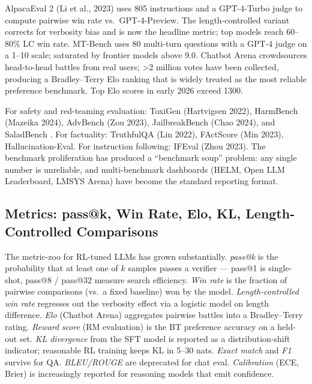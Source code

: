 \documentclass{article}
\begin{document}
AlpacaEval 2 (Li et al., 2023) uses 805 instructions and a GPT-4-Turbo judge to compute pairwise win rate vs.~GPT-4-Preview. The length-controlled variant \citep{park2024disentanglinglengt} corrects for verbosity bias and is now the headline metric; top models reach 60--80\% LC win rate. MT-Bench \citep{zheng20232023} uses 80 multi-turn questions with a GPT-4 judge on a 1--10 scale; saturated by frontier models above 9.0. Chatbot Arena \citep{chiang20242024} crowdsources head-to-head battles from real users; \textgreater2 million votes have been collected, producing a Bradley--Terry Elo ranking that is widely treated as the most reliable preference benchmark. Top Elo scores in early 2026 exceed 1300.

For safety and red-teaming evaluation: ToxiGen (Hartvigsen 2022), HarmBench (Mazeika 2024), AdvBench (Zou 2023), JailbreakBench (Chao 2024), and SaladBench \citep{li20252025}. For factuality: TruthfulQA (Lin 2022), FActScore (Min 2023), Hallucination-Eval. For instruction following: IFEval (Zhou 2023). The benchmark proliferation has produced a ``benchmark soup'' problem: any single number is unreliable, and multi-benchmark dashboards (HELM, Open LLM Leaderboard, LMSYS Arena) have become the standard reporting format.

\subsection{Metrics: pass@k, Win Rate, Elo, KL, Length-Controlled Comparisons}\label{metrics-passk-win-rate-elo-kl-length-controlled-comparisons}

The metric-zoo for RL-tuned LLMs has grown substantially. \emph{pass@k} \citep{chen20212021} is the probability that at least one of \(k\) samples passes a verifier --- pass@1 is single-shot, pass@8 / pass@32 measure search efficiency. \emph{Win rate} is the fraction of pairwise comparisons (vs.~a fixed baseline) won by the model. \emph{Length-controlled win rate} \citep{park2024disentanglinglengt} regresses out the verbosity effect via a logistic model on length difference. \emph{Elo} (Chatbot Arena) aggregates pairwise battles into a Bradley--Terry rating. \emph{Reward score} (RM evaluation) is the BT preference accuracy on a held-out set. \emph{KL divergence} from the SFT model is reported as a distribution-shift indicator; reasonable RL training keeps KL in 5--30 nats. \emph{Exact match} and \emph{F1} survive for QA. \emph{BLEU/ROUGE} are deprecated for chat eval. \emph{Calibration} (ECE, Brier) is increasingly reported for reasoning models that emit confidence.
\end{document}
